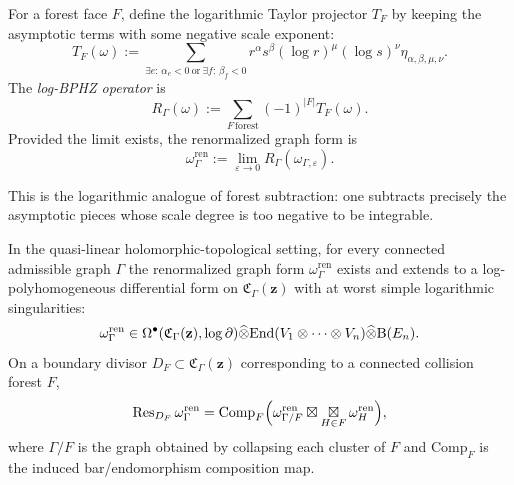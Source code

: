 \begin{definition}%
For a forest face $F$, define the logarithmic Taylor projector $T_F$ by keeping the asymptotic terms with some negative scale exponent:
\[
 T_F(\omega)
 :=
 \sum_{\exists e:\,\alpha_e<0\ \text{or}\ \exists f:\,\beta_f<0}
 r^{\alpha}s^{\beta}(\log r)^{\mu}(\log s)^{\nu}
 \eta_{\alpha,\beta,\mu,\nu}.
\]
The \emph{log-BPHZ operator} is
\[
 R_\Gamma(\omega):=\sum_{F\,\mathrm{forest}}(-1)^{|F|}T_F(\omega).
\]
Provided the limit exists, the renormalized graph form is
\[
 \omega_\Gamma^{\mathrm{ren}}:=\lim_{\varepsilon\to 0}R_\Gamma(\omega_{\Gamma,\varepsilon}).
\]
\end{definition}

This is the logarithmic analogue of forest subtraction: one subtracts precisely the asymptotic pieces whose scale degree is too negative to be integrable.

\begin{theorem}%
In the quasi-linear holomorphic-topological setting, for every connected admissible graph $\Gamma$ the renormalized graph form $\omega_\Gamma^{\mathrm{ren}}$ exists and extends to a log-polyhomogeneous differential form on $\mathfrak C_\Gamma(\mathbf z)$ with at worst simple logarithmic singularities:
\[
 \omega_\Gamma^{\mathrm{ren}}
 \in
 \Omega^{\bullet}(\mathfrak C_\Gamma(\mathbf z),\log\partial)
 \widehat\otimes
 \mathrm{End}(V_1\otimes\cdots\otimes V_n)\widehat\otimes \mathrm B(E_n).
\]
On a boundary divisor $D_F\subset\mathfrak C_\Gamma(\mathbf z)$ corresponding to a connected collision forest $F$,
\[
 \mathrm{Res}_{D_F}\,\omega_\Gamma^{\mathrm{ren}}
 =
 \mathrm{Comp}_F\Big(
 \omega_{\Gamma/F}^{\mathrm{ren}}
 \boxtimes
 \mathop{\boxtimes}\displaylimits_{H\in F}\omega_H^{\mathrm{ren}}
 \Big),
\]
where $\Gamma/F$ is the graph obtained by collapsing each cluster of $F$ and $\mathrm{Comp}_F$ is the induced bar/endomorphism composition map.
\end{theorem}

